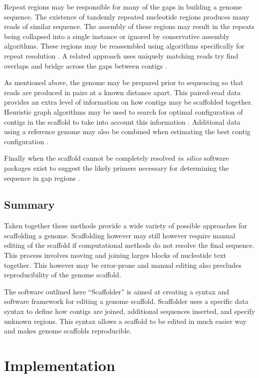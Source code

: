 \documentclass[10pt]{bmc_article}
\newenvironment{bmcformat}{\begin{raggedright}\baselineskip20pt\sloppy\setboolean{publ}{false}}{\end{raggedright}\baselineskip20pt\sloppy}
\begin{document}
\begin{bmcformat}
Repeat regions may be responsible for many of the gaps in building a genome
sequence. The existence of tandemly repeated nucleotide regions produces many
reads of similar sequence. The assembly of these regions may result in the
repeats being collapsed into a single instance or ignored by conservative
assembly algorithms. These regions may be reassembled using algorithms
specifically for repeat resolution \cite{mulyukov2002,koren2010}. A related
approach uses uniquely matching reads try find overlaps and bridge across the
gaps between contigs \cite{tsai2010}. \pb

As mentioned above, the genome may be prepared prior to sequencing so that
reads are produced in pairs at a known distance apart. This paired-read data
provides an extra level of information on how contigs may be scaffolded
together. Heuristic graph algorithms may be used to search for optimal
configuration of contigs in the scaffold to take into account this information
\cite{dayarian2010}. Additional data using a reference genome may also be
combined when estimating the best contig configuration \cite{pop2004}. \pb

Finally when the scaffold cannot be completely resolved \emph{in silico}
software packages exist to suggest the likely primers necessary for determining
the sequence in gap regions \cite{gordon2001,nagarajan2010}. \pb

\subsection*{Summary} %

Taken together these methods provide a wide variety of possible approaches for
scaffolding a genome. Scaffolding however may still however require manual
editing of the scaffold if computational methods do not resolve the final
sequence.  This process involves moving and joining larges blocks of nucleotide
text together. This however may be error-prone and manual editing also
precludes reproducibility of the genome scaffold. \pb

The software outlined here ``Scaffolder'' is aimed at creating a syntax and
software framework for editing a genome scaffold. Scaffolder uses a specific
data syntax to define how contigs are joined, additional sequences inserted,
and specify unknown regions. This syntax allows a scaffold to be edited in much
easier way and makes genome scaffolds reproducible. \pb

\section*{Implementation} %


\end{bmcformat}
\end{document}
